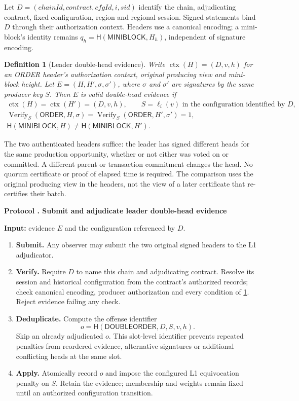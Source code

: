\documentclass[11pt,a4paper,onecolumn]{article}
\newcommand{\Hash}{\mathsf H}
\newcommand{\Tag}[1]{\ensuremath{\mathsf{#1}}}
\newtheorem{definition}{Definition}[section]
\newcounter{protocol}
\newenvironment{protocol}[2]{\refstepcounter{protocol}\label{#1}
\begin{mdframed}[nobreak=true,linewidth=.6pt,skipabove=9pt,skipbelow=9pt,
innertopmargin=7pt,innerbottommargin=7pt]\small
\noindent\textbf{Protocol \theprotocol. #2}\par\smallskip}{\end{mdframed}}
\begin{document}
Let $D=(\mathit{chainId},\mathit{contract},\mathit{cfgId},i,\mathit{sid})$
identify the chain, adjudicating contract, fixed configuration, region and
regional session. Signed statements bind $D$ through their authorization
context. Headers use a canonical encoding; a mini-block's identity remains
$q_h=\Hash(\Tag{MINIBLOCK},H_h)$, independent of signature encoding.

\begin{definition}[Leader double-head evidence]\label{def:double-head}
Write $\operatorname{ctx}(H)=(D,v,h)$ for an ORDER header's authorization
context, original producing view and mini-block height. Let
$E=(H,H',\sigma,\sigma')$, where $\sigma$ and $\sigma'$ are signatures by
the same producer key $S$. Then $E$ is valid double-head evidence if
\[
 \begin{gathered}
 \operatorname{ctx}(H)=\operatorname{ctx}(H')=(D,v,h),
 \qquad S=\ell_i(v)\text{ in the configuration identified by }D,\\
 \operatorname{Verify}_{S}(\Tag{ORDER},H,\sigma)
 =\operatorname{Verify}_{S}(\Tag{ORDER},H',\sigma')=1,\\
 \Hash(\Tag{MINIBLOCK},H)\ne\Hash(\Tag{MINIBLOCK},H').
 \end{gathered}
\]
\end{definition}
The two authenticated headers suffice: the leader has signed different
heads for the same production opportunity, whether or not either was voted
on or committed. A different parent or transaction commitment changes the
head. No quorum certificate or proof of elapsed time is required.
The comparison uses the original producing view in the headers, not the view
of a later certificate that re-certifies their batch.

\begin{protocol}{alg:slash}{Submit and adjudicate leader double-head evidence}
\textbf{Input:} evidence $E$ and the configuration referenced by $D$.
\begin{enumerate}[label=\textbf{E\arabic*.}]
\item \textbf{Submit.} Any observer may submit the two original signed
headers to the L1 adjudicator.
\item \textbf{Verify.} Require $D$ to name this chain and adjudicating
contract. Resolve its session and historical configuration from the
contract's authorized records; check canonical encoding, producer
authorization and every condition of \cref{def:double-head}. Reject evidence
failing any check.
\item \textbf{Deduplicate.} Compute the offense identifier
\[
 o=\Hash(\Tag{DOUBLEORDER},D,S,v,h).
\]
Skip an already adjudicated $o$. This slot-level identifier prevents repeated
penalties from reordered evidence, alternative signatures or additional
conflicting heads at the same slot.
\item \textbf{Apply.} Atomically record $o$ and impose the configured L1
equivocation penalty on $S$. Retain the evidence; membership and weights
remain fixed until an authorized configuration transition.
\end{enumerate}
\end{protocol}
\end{document}
